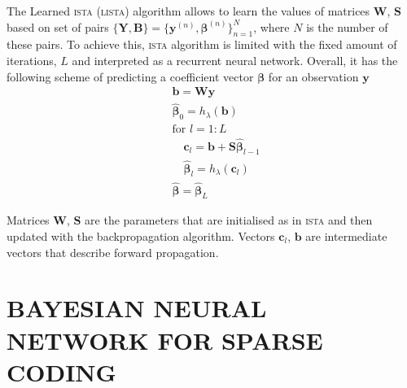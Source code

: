 \documentclass[letterpaper]{article}
\begin{document}
The Learned \textsc{ista} (\textsc{lista}) \citep{gregor2010learning} algorithm allows to learn the values of matrices $\mathbf{W}$, $\mathbf{S}$ based on set of pairs $\{\mathbf{Y}, \mathbf{B}\}=\{\mathbf{y}^{(n)}, \boldsymbol\beta^{(n)}\}_{n=1}^N$, where $N$ is the number of these pairs. To achieve this, \textsc{ista} algorithm is limited with the fixed amount of iterations, $L$ and interpreted as a recurrent neural network. Overall, it has the following scheme of predicting a coefficient vector $\boldsymbol\beta$ for an observation $\mathbf{y}$
\begin{align}
\label{eq:first_layer}
&\mathbf{b} = \mathbf{W}\mathbf{y}\\
\label{eq:thr_first}
&\widehat{\boldsymbol\beta}_0 = h_\lambda(\mathbf{b}) \\
&\text{for } l=1:L\\
\label{eq:l_dense_layer}
	&\quad \mathbf{c}_l = \mathbf{b} + \mathbf{S}\widehat{\boldsymbol\beta}_{l-1} \\
\label{eq:l_thr}
	&\quad \widehat{\boldsymbol\beta}_{l} = h_\lambda(\mathbf{c}_l) \\
& \widehat{\boldsymbol\beta} = \widehat{\boldsymbol\beta}_{L}
\end{align}

Matrices $\mathbf{W}$, $\mathbf{S}$ are the parameters that are initialised as in \textsc{ista} and then updated with the backpropagation algorithm. Vectors $\mathbf{c}_l$, $\mathbf{b}$ are intermediate vectors that describe forward propagation. 

\section{\uppercase{Bayesian neural network for sparse coding}}
\label{sec:bayesian_lista}
\end{document}
